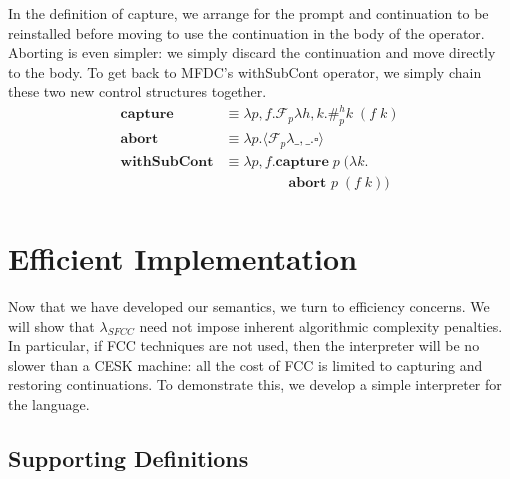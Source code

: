 \documentclass[11pt]{article}
\newcommand{\maybePage}{\null}
\newcommand\F{\mathcal{F}}
\newcommand{\angles}[1]{\langle#1\rangle}
\begin{document}
In the definition of capture, we arrange for the prompt and continuation to be reinstalled before moving to use the continuation in the body of the operator.
Aborting is even simpler: we simply discard the continuation and move directly to the body.
To get back to MFDC's \textsf{withSubCont} operator, we simply chain these two new control structures together.
\begin{align*}
\textbf{capture} &\equiv
	\lambda p,f.\F_p\lambda h,k.\#_p^hk\;(f\;k) \\
\textbf{abort } &\equiv
	\lambda p.\angles{\F_p\lambda \_,\_.\square} \\
\textbf{withSubCont} &\equiv
	\lambda p,f.\textbf{capture}\;p\;(\lambda k. \\
	&\qquad\qquad\;\;	\textbf{abort }p\;(f\;k)) \\
\end{align*}







%

\maybePage
\section{Efficient Implementation}
\label{sec:efficientImpl}

Now that we have developed our semantics, we turn to efficiency concerns.
We will show that $\lambda_{SFCC}$ need not impose inherent algorithmic complexity penalties.
In particular, if FCC techniques are not used, then the interpreter will be no slower than a CESK machine: all the cost of FCC is limited to capturing and restoring continuations.
To demonstrate this, we develop a simple interpreter for the language.

\maybePage
\subsection{Supporting Definitions}
\end{document}
